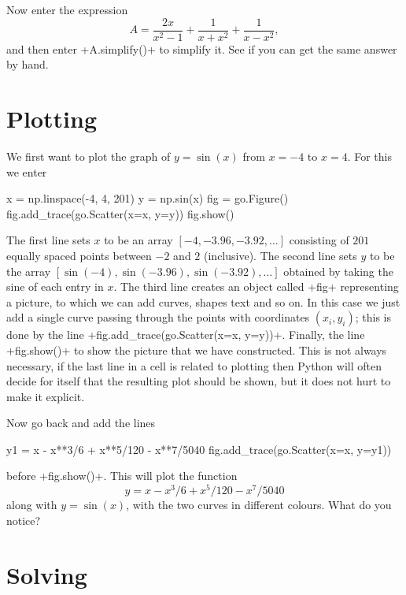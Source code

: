 \documentclass[a4paper,10pt]{amsbook}
\begin{document}
\begin{exercise}\label{ex-rat-misc}
 Now enter the expression
 \[ A = \frac{2x}{x^2-1} + \frac{1}{x+x^2} + \frac{1}{x-x^2}, \]
 and then enter \pcode+A.simplify()+ to simplify it.  See if you can
 get the same answer by hand.
\end{exercise}

\section{Plotting}

\begin{exercise}\label{ex-sin-taylor}
 We first want to plot the graph of $y=\sin(x)$ from $x=-4$ to
 $x=4$.  For this we enter
 \begin{pcodeblock}
  x = np.linspace(-4, 4, 201)
  y = np.sin(x)
  fig = go.Figure()
  fig.add_trace(go.Scatter(x=x, y=y))
  fig.show()
 \end{pcodeblock}
 The first line sets $x$ to be an array $[-4,-3.96,-3.92,\dotsc]$
 consisting of $201$ equally spaced points between $-2$ and $2$
 (inclusive).  The second line sets $y$ to be the array 
 $[\sin(-4),\sin(-3.96),\sin(-3.92),\dotsc]$ obtained by taking the
 sine of each entry in $x$.  The third line creates an object
 called \pcode+fig+ representing a picture, to which we can add
 curves, shapes text and so on.  In this case we just add a single
 curve passing through the points with coordinates $(x_i,y_i)$; this
 is done by the line \pcode+fig.add_trace(go.Scatter(x=x, y=y))+.
 Finally, the line \pcode+fig.show()+ to show the picture that we have
 constructed.  This is not always necessary, if the last line in a
 cell is related to plotting then Python will often decide for itself
 that the resulting plot should be shown, but it does not hurt to make
 it explicit.

 Now go back and add the lines
 \begin{pcodeblock}
  y1 = x - x**3/6 + x**5/120 - x**7/5040
  fig.add_trace(go.Scatter(x=x, y=y1))
 \end{pcodeblock}
 before \pcode+fig.show()+.  This will plot the function
 \[ y = x-x^3/6+x^5/120-x^7/5040 \]
 along with $y=\sin(x)$, with the two curves in different colours.
 What do you notice?  
\end{exercise}

\section{Solving}
\end{document}
